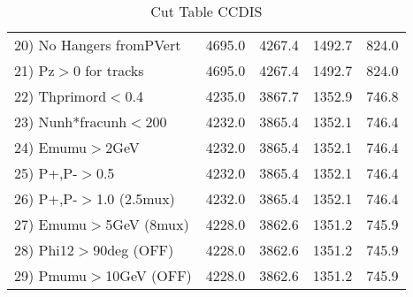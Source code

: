 \begin{table}[h!]
\begin{tabular}{||l||r|r|r|r||}
 20) No Hangers fromPVert &      4695.0 &      4267.4 &      1492.7 &       824.0 \\
 21) Pz$>$0 for tracks    &      4695.0 &      4267.4 &      1492.7 &       824.0 \\
 22) Thprimord$<$0.4      &      4235.0 &      3867.7 &      1352.9 &       746.8 \\
 23) Nunh*fracunh$<$200   &      4232.0 &      3865.4 &      1352.1 &       746.4 \\
 24) Emumu$>$2GeV         &      4232.0 &      3865.4 &      1352.1 &       746.4 \\
 25) P+,P-$>$0.5          &      4232.0 &      3865.4 &      1352.1 &       746.4 \\
 26) P+,P-$>$1.0 (2.5mux) &      4232.0 &      3865.4 &      1352.1 &       746.4 \\
 27) Emumu$>$5GeV  (8mux) &      4228.0 &      3862.6 &      1351.2 &       745.9 \\
 28) Phi12$>$90deg  (OFF) &      4228.0 &      3862.6 &      1351.2 &       745.9 \\
 29) Pmumu$>$10GeV  (OFF) &      4228.0 &      3862.6 &      1351.2 &       745.9 \\
 \hline
 \hline
 \end{tabular}
 \caption{Cut Table  CCDIS  }
 \label{tab-cut_ccdis}
 \end{table}
